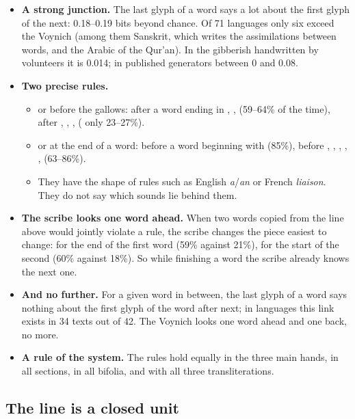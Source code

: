\begin{itemize}
\item \textbf{A strong junction.} The last glyph of a word says a lot about the first glyph of the next: 0.18--0.19 bits
  beyond chance. Of 71 languages only six exceed the Voynich (among them Sanskrit, which writes the assimilations between
  words, and the Arabic of the Qur'an). In the gibberish handwritten by volunteers it is 0.014; in published generators
  between 0 and 0.08.
\item \textbf{Two precise rules.}
  \begin{itemize}
  \item {} or  before the gallows:  after a word ending in , , 
    (59--64\% of the time),  after , , ,  ( only 23--27\%).
  \item {} or  at the end of a word:  before a word beginning with  (85\%),  before
    , , , , ,  (63--86\%).
  \item They have the shape of rules such as English \emph{a}/\emph{an} or French \emph{liaison}. They do not say which
    sounds lie behind them.
  \end{itemize}
\item \textbf{The scribe looks one word ahead.} When two words copied from the line above would jointly violate a rule,
  the scribe changes the piece easiest to change: for  the end of the first word (59\% against 21\%), for
   the start of the second (60\% against 18\%). So while finishing a word the scribe already knows the next
  one.
\item \textbf{And no further.} For a given word in between, the last glyph of a word says nothing about the first glyph of
  the word after next; in languages this link exists in 34 texts out of 42. The Voynich looks one word ahead and one
  back, no more.
\item \textbf{A rule of the system.} The rules hold equally in the three main hands, in all sections, in all bifolia, and
  with all three transliterations.
\end{itemize}

\subsection{The line is a closed unit}

